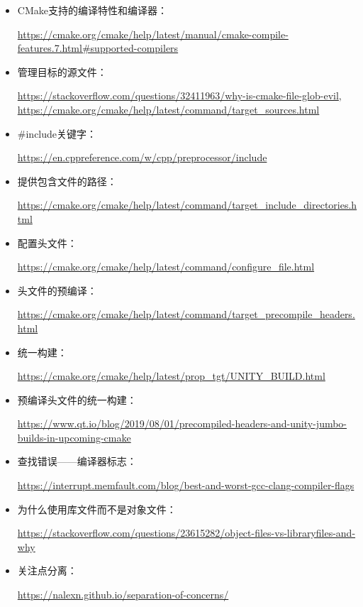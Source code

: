 

\begin{itemize}
\item
CMake支持的编译特性和编译器：

\url{https://cmake.org/cmake/help/latest/manual/cmake-compile-features.7.html#supported-compilers}

\item
管理目标的源文件：

\url{https://stackoverflow.com/questions/32411963/why-is-cmake-file-glob-evil}, \url{https://cmake.org/cmake/help/latest/command/target_sources.html}

\item
\#include关键字：

\url{https://en.cppreference.com/w/cpp/preprocessor/include}

\item
提供包含文件的路径：

\url{https://cmake.org/cmake/help/latest/command/target_include_directories.html}

\item
配置头文件：

\url{https://cmake.org/cmake/help/latest/command/configure_file.html}

\item
头文件的预编译：

\url{https://cmake.org/cmake/help/latest/command/target_precompile_headers.html}

\item
统一构建：

\url{https://cmake.org/cmake/help/latest/prop_tgt/UNITY_BUILD.html}

\item
预编译头文件的统一构建：

\url{https://www.qt.io/blog/2019/08/01/precompiled-headers-and-unity-jumbo-builds-in-upcoming-cmake}

\item
查找错误——编译器标志：

\url{https://interrupt.memfault.com/blog/best-and-worst-gcc-clang-compiler-flags}

\item
为什么使用库文件而不是对象文件：

\url{https://stackoverflow.com/questions/23615282/object-files-vs-libraryfiles-and-why}

\item
关注点分离：

\url{https://nalexn.github.io/separation-of-concerns/}
\end{itemize}